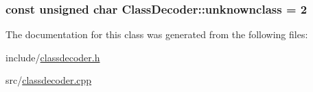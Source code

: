 \subsubsection[{unknownclass}]{\setlength{\rightskip}{0pt plus 5cm}const unsigned char Class\+Decoder\+::unknownclass = 2\hspace{0.3cm}{\ttfamily [static]}}\label{classClassDecoder_a802ad043ecd17751c2e3520170649f4e}


The documentation for this class was generated from the following files\+:\begin{DoxyCompactItemize}
\item 
include/\hyperlink{classdecoder_8h}{classdecoder.\+h}\item 
src/\hyperlink{classdecoder_8cpp}{classdecoder.\+cpp}\end{DoxyCompactItemize}
